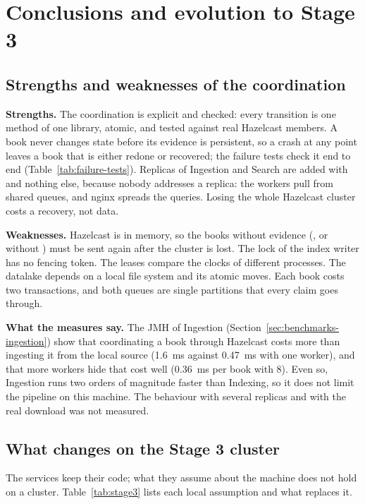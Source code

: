 \section{Conclusions and evolution to Stage 3}
\label{sec:stage3}

\subsection{Strengths and weaknesses of the coordination}

\textbf{Strengths.} The coordination is explicit and checked: every transition is one method of one library, atomic,
and tested against real Hazelcast members. A book never changes state before its evidence is persistent, so a crash
at any point leaves a book that is either redone or recovered; the failure tests check it end to end
(Table~\ref{tab:failure-tests}). Replicas of
Ingestion and Search are added with  and nothing else, because nobody addresses a replica: the workers
pull from shared queues, and nginx spreads the queries. Losing the whole Hazelcast cluster costs a recovery, not data.

\textbf{Weaknesses.} Hazelcast is in memory, so the books without evidence (, or  without
) must be sent again after the cluster is lost. The lock of the index writer has no fencing token. The
leases compare the clocks of different processes. The datalake depends on a local file system and its atomic moves. Each
book costs two transactions, and both queues are single partitions that every claim goes through.

\textbf{What the measures say.} The JMH of Ingestion (Section~\ref{sec:benchmarks-ingestion}) show that coordinating a
book through Hazelcast costs more than ingesting it from the local source (1.6~ms against 0.47~ms with one worker), and that
more workers hide that cost well (0.36~ms per book with 8). Even so, Ingestion runs two orders of magnitude faster than
Indexing, so it does not limit the pipeline on this machine. The behaviour with several replicas and with the real
download was not measured.

\subsection{What changes on the Stage 3 cluster}

The services keep their code; what they assume about the machine does not hold on a cluster. Table~\ref{tab:stage3}
lists each local assumption and what replaces it.

